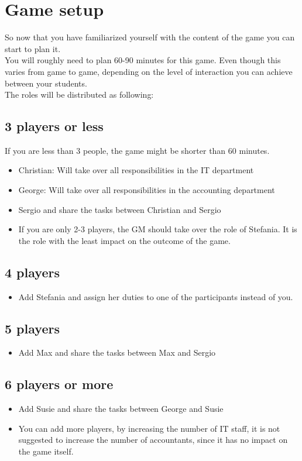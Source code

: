 \chapter{Game setup}
\label{sec:game_setup}

So now that you have familiarized yourself with the content of the game you can start to plan it.
\\

You will roughly need to plan 60-90 minutes for this game.
Even though this varies from game to game, depending on the level of interaction you can achieve between your students.
\\

The roles will be distributed as following:

\section{3 players or less}

If you are less than 3 people, the game might be shorter than 60 minutes.

\begin{itemize}
    \item Christian: Will take over all responsibilities in the IT department
    \item George: Will take over all responsibilities in the accounting department
    \item Sergio and share the tasks between Christian and Sergio
    \item If you are only 2-3 players, the GM should take over the role of Stefania.
        It is the role with the least impact on the outcome of the game.
\end{itemize}

\section{4 players}

\begin{itemize}
    \item Add Stefania and assign her duties to one of the participants instead of you.
\end{itemize}

\section{5 players}

\begin{itemize}
    \item Add Max and share the tasks between Max and Sergio
\end{itemize}

\section{6 players or more}

\begin{itemize}
    \item Add Susie and share the tasks between George and Susie
    \item You can add more players, by increasing the number of IT staff, it is not suggested to increase the number of accountants, since it has no impact on the game itself.
\end{itemize}